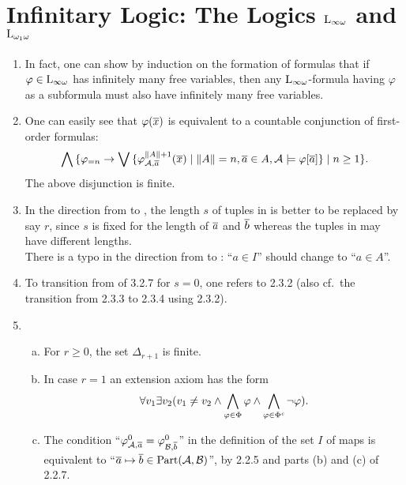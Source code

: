 \section{Infinitary Logic: The Logics $\inflog{\infty}$ and $\inflog{\omega_1}$}
\begin{enumerate}[1.]
%
\item {} In fact, one can show by induction on the formation of formulas that if $\varphi \in \inflog{\infty}$ has infinitely many free variables, then any $\inflog{\infty}$-formula having $\varphi$ as a subformula must also have infinitely many free variables.
%
\item {} One can easily see that $\varphi(\overline{x})$ is equivalent to a countable conjunction of first-order formulas:
\[
\bigwedge {\{\varphi_{= n} \rightarrow\bigvee{\{\varphi^{\|A\| + 1}_{\mathcal{A}, \overline{a}}(\overline{x}) \mid \|A\| = n, \overline{a} \in A, \mathcal{A} \models\varphi[\overline{a}]\}} \mid n \geq 1\}}.
\]
The above disjunction is finite.
%
\item {} In the direction from  to , the length $s$ of tuples in  is better to be replaced by say $r$, since $s$ is fixed for the length of $\overline{a}$ and $\overline{b}$ whereas the tuples in  may have different lengths.
\medskip\\
There is a typo in the direction from  to : ``$a \in I$'' should change to ``$a \in A$''.
%
\item {} To transition from  of 3.2.7 for $s = 0$, one refers to 2.3.2 (also cf.\ the transition from 2.3.3 to 2.3.4 using 2.3.2).
%
\item {}
\begin{enumerate}[(a)]
\item For $r \geq 0$, the set $\Delta_{r + 1}$ is finite.
\item In case $r = 1$ an extension axiom has the form
\[
\forall v_1 \exists v_2 (v_1 \neq v_2 \land \bigwedge_{\varphi \in \Phi} \varphi \land \bigwedge_{\varphi \in \Phi^\mathit{c}} \neg\varphi).
\]
\item The condition ``$\varphi^{0}_{\mathcal{A}, \overline{a}} = \varphi^{0}_{\mathcal{B}, \overline{b}}$'' in the definition of the set $I$ of maps is equivalent to ``$\overline{a} \mapsto \overline{b} \in \mathrm{Part}(\mathcal{A}, \mathcal{B})$'', by 2.2.5 and parts (b) and (c) of 2.2.7.

\end{enumerate}
\end{enumerate}
